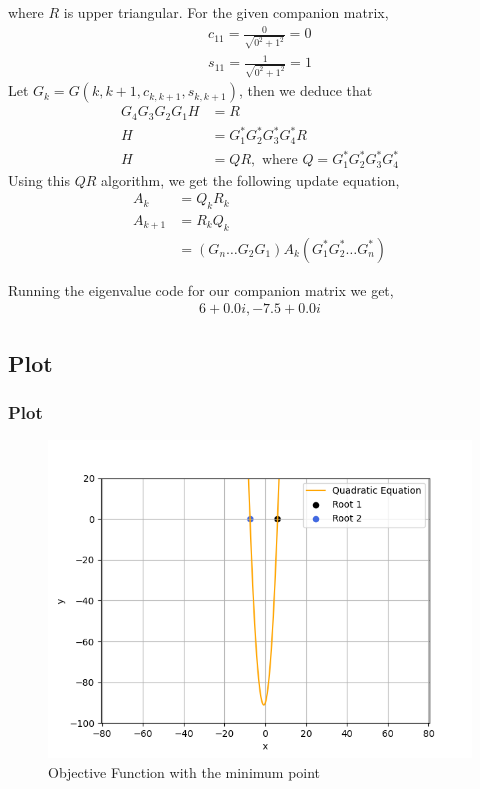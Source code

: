\documentclass{beamer}
\providecommand{\brak}[1]{\ensuremath{\left(#1\right)}}
\theoremstyle{remark}
\numberwithin{equation}{section}
\begin{document}
\begin{frame}
where $R$ is upper triangular.
\newline
For the given companion matrix,
\begin{align}
  c_{11} = \frac{0}{\sqrt{0^2 + 1^2}} = 0\\
  s_{11} = \frac{1}{\sqrt{0^2 + 1^2}} = 1
\end{align}
Let $G_k = G\brak{k, k + 1, c_{k, k+1}, s_{k, k+1}}$, then we deduce that
\begin{align}
    G_4 G_3 G_2 G_1 H &= R\\
    H &= G_1^{\ast} G_2^{\ast} G_3^{\ast} G_4^{\ast} R\\
    H &= QR, \text{ where } Q = G_1^{\ast} G_2^{\ast} G_3^{\ast} G_4^{\ast}
\end{align}
Using this $QR$ algorithm, we get the following update equation,
\begin{align}
  A_{k} &= Q_{k}R_{k}\\
  A_{k + 1} &= R_{k}Q_{k}\\
            &= \brak{G_{n}\dots G_{2} G_{1}} A_{k} \brak{G_1^{\ast} G_2^{\ast} \dots G_n^{\ast}}
\end{align}
\end{frame}

\begin{frame}
    Running the eigenvalue code for our companion matrix we get,
    \begin{align}
        6 + 0.0i, -7.5 + 0.0i
    \end{align}
\end{frame}

\subsection{Plot}
\begin{frame}
\frametitle{Plot}
\begin{figure}[h!]
   \centering
   \includegraphics[width=0.7\linewidth]{figs/graph.png}
   \caption{Objective Function with the minimum point}
\end{figure}
\end{frame}
\end{document}
